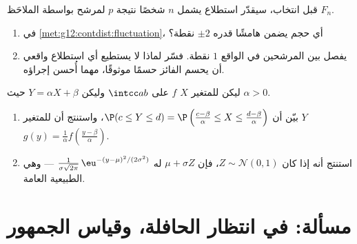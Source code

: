 \begin{exercise}[$\star\star\star$]\label{exo:g12:contdist:8}
قبل انتخاب، سيقدّر استطلاع يشمل $n$ شخصًا نتيجة $p$ لمرشح
بواسطة  الملاحَظ $F_n$.
\begin{enumerate}
  \item {} في
        \cref{met:g12:contdist:fluctuation}، أي حجم  يضمن
        هامشًا قدره $\pm 2$ نقطة؟
  \item يفصل بين المرشحين في الواقع $1$ نقطة. فسّر لماذا
        لا يستطيع أي استطلاع واقعي أن يحسم الفائز حسمًا موثوقًا، مهما
        أُحسن إجراؤه.
\end{enumerate}
\end{exercise}

\begin{exercise}[$\star\star\star$]\label{exo:g12:contdist:9}
ليكن للمتغير $X$  $f$ على $\intcc ab$ وليكن
$Y = \alpha X + \beta$ حيث $\alpha > 0$.
\begin{enumerate}
  \item بيّن أن $\P(c \leq Y \leq d)
        = \P\left(\frac{c - \beta}{\alpha} \leq X \leq
        \frac{d-\beta}{\alpha}\right)$، واستنتج أن للمتغير $Y$ 
        $g(y) = \frac{1}{\alpha} f\left(\frac{y - \beta}{\alpha}\right)$.
  \item استنتج أنه إذا كان $Z \sim \mathcal N(0,1)$، فإن
        $\mu + \sigma Z$ له 
        $\frac{1}{\sigma\sqrt{2\pi}}\,
        \eu^{-(y - \mu)^2/(2\sigma^2)}$ --- وهي  الطبيعية العامة.
\end{enumerate}
\end{exercise}

\section{مسألة: في انتظار الحافلة، وقياس الجمهور}

